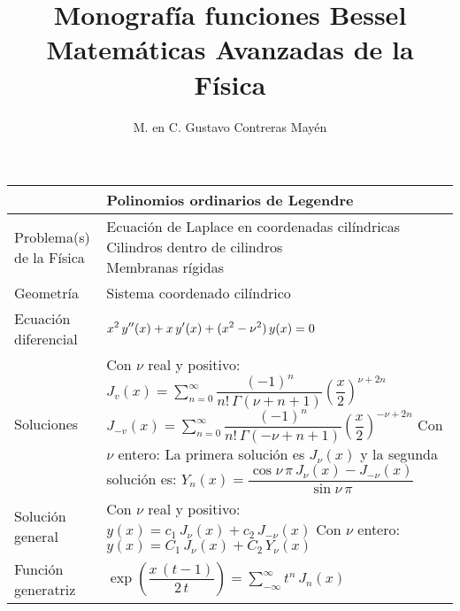 
\title{Monografía funciones Bessel \\ \large {Matemáticas Avanzadas de la Física} \vspace{-3ex}}
\author{M. en C. Gustavo Contreras Mayén}
\date{ }

\maketitle
\fontsize{14}{14}\selectfont
\renewcommand\arraystretch{2}
\vspace*{-3cm}
\begin{table}[H]
    \centering
\begin{tabular}{| p{5cm} | p{12cm} |} \hline
\multicolumn{2}{|c|}{\textbf{Polinomios ordinarios de Legendre}} \\ \hline
Problema(s) de la Física & \makecell[l]{Ecuación de Laplace en coordenadas cilíndricas \\ Cilindros dentro de cilindros \\ Membranas rígidas} \\ \hline
Geometría & Sistema coordenado cilíndrico \\ \hline
Ecuación diferencial & \(\displaystyle
x^{2} \, {y}^{\prime \prime} (x) +  x \, {y}^{\prime} (x) +  (x^{2} - \nu^{2}) \, y(x) = 0
\) \\ \hline
Soluciones & \makecell[l]{ Con $\nu$ real y positivo: \\ \( J_{v} (x) = \sum_{n=0}^{\infty} \dfrac{(-1)^{n}}{n! \, \Gamma (\nu + n + 1)} \left( \dfrac{x}{2} \right)^{\nu+2n} \) \\ \( J_{-v} (x) = \sum_{n=0}^{\infty} \dfrac{(-1)^{n}}{n! \, \Gamma (-\nu + n + 1)} \left( \dfrac{x}{2} \right)^{-\nu+2n} \) \\ Con $\nu$ entero: \\
La primera solución es $J_{\nu}(x)$ y la segunda solución es: \\
\( Y_{n} (x) = \dfrac{\cos \nu \, \pi \, J_{\nu} (x) - J_{-\nu} (x)}{\sin \nu \, \pi}
\)} \\ \hline
Solución general & \makecell[l]{ Con $\nu$ real y positivo: \\ \( \displaystyle y(x) = c_{1} \, J_{\nu}(x) + c_{2} \, J_{-\nu} (x) \) \\ Con $\nu$ entero: \\ \( \displaystyle y(x) = C_{1} \, J_{\nu}(x) + C_{2} \, Y_{\nu} (x) \) } \\ \hline
Función generatriz & \(\displaystyle \exp(\dfrac{x \, (t - 1)}{2 \, t}) = \sum_{-\infty}^{\infty} t^{n} \, J_{n} (x) \) \\ \hline

\end{tabular}
\end{table}
